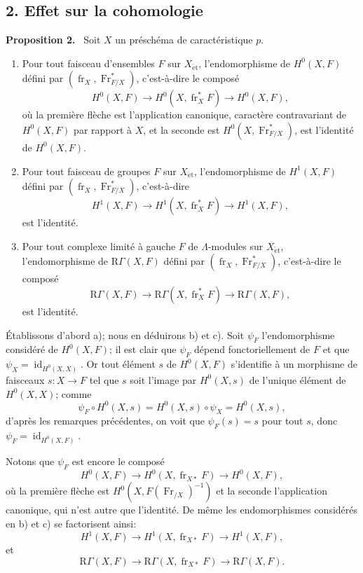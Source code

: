 \documentclass[11pt]{article}
\newenvironment{statement}[1]{\par\medskip\noindent\textbf{#1.}\ }{\par\medskip}
\providecommand{\et}{\mathrm{\acute{e}t}}
\providecommand{\RGamma}{\mathrm R\Gamma}
\providecommand{\id}{\operatorname{id}}
\providecommand{\id}{\operatorname{id}}
\providecommand{\id}{\operatorname{id}}
\providecommand{\RGamma}{\mathrm R\Gamma}
\providecommand{\id}{\operatorname{id}}
\providecommand{\id}{\operatorname{id}}
\providecommand{\fr}{\operatorname{fr}}
\providecommand{\Fr}{\operatorname{Fr}}
\providecommand{\Fr}{\operatorname{Fr}}
\providecommand{\fr}{\operatorname{fr}}
\providecommand{\id}{\operatorname{id}}
\providecommand{\RGamma}{\mathrm R\Gamma}
\providecommand{\et}{\acute{e}t}
\begin{document}
\subsection*{2. Effet sur la cohomologie}

\begin{statement}{Proposition 2}
Soit $X$ un préschéma de caractéristique $p$.
\begin{enumerate}[label=\alph*)]
\item Pour tout faisceau d'ensembles $F$ sur $X_{\et}$, l'endomorphisme de $H^0(X,F)$ défini par $(\fr_X,\Fr^*_{F/X})$, c'est-à-dire le composé
\[
H^0(X,F)\longrightarrow H^0(X,\fr_X^*F)\longrightarrow H^0(X,F),
\]
où la première flèche est l'application canonique, caractère contravariant de $H^0(X,F)$ par rapport à $X$, et la seconde est $H^0(X,\Fr^*_{F/X})$, est l'identité de $H^0(X,F)$.
\item Pour tout faisceau de groupes $F$ sur $X_{\et}$, l'endomorphisme de $H^1(X,F)$ défini par $(\fr_X,\Fr^*_{F/X})$, c'est-à-dire
\[
H^1(X,F)\longrightarrow H^1(X,\fr_X^*F)\longrightarrow H^1(X,F),
\]
est l'identité.
\item Pour tout complexe limité à gauche $F$ de $\Lambda$-modules sur $X_{\et}$, l'endomorphisme de $\RGamma(X,F)$ défini par $(\fr_X,\Fr^*_{F/X})$, c'est-à-dire le composé
\[
\RGamma(X,F)\longrightarrow \RGamma(X,\fr_X^*F)\longrightarrow \RGamma(X,F),
\]
est l'identité.
\end{enumerate}
\end{statement}

Établissons d'abord a); nous en déduirons b) et c). Soit $\psi_F$ l'endomorphisme considéré de $H^0(X,F)$; il est clair que $\psi_F$ dépend fonctoriellement de $F$ et que $\psi_X=\id_{H^0(X,X)}$. Or tout élément $s$ de $H^0(X,F)$ s'identifie à un morphisme de faisceaux $s:X\to F$ tel que $s$ soit l'image par $H^0(X,s)$ de l'unique élément de $H^0(X,X)$; comme
\[
\psi_F\circ H^0(X,s)=H^0(X,s)\circ\psi_X=H^0(X,s),
\]
d'après les remarques précédentes, on voit que $\psi_F(s)=s$ pour tout $s$, donc $\psi_F=\id_{H^0(X,F)}$.

Notons que $\psi_F$ est encore le composé
\[
H^0(X,F)\longrightarrow H^0(X,\fr_{X*}F)
\longrightarrow H^0(X,F),
\]
où la première flèche est $H^0(X,F(\Fr_{/X})^{-1})$ et la seconde l'application canonique, qui n'est autre que l'identité. De même les endomorphismes considérés en b) et c) se factorisent ainsi:
\[
H^1(X,F)\longrightarrow H^1(X,\fr_{X*}F)
\longrightarrow H^1(X,F),
\]
et
\[
\RGamma(X,F)\longrightarrow \RGamma(X,\fr_{X*}F)
\longrightarrow \RGamma(X,F).
\]
\end{document}
